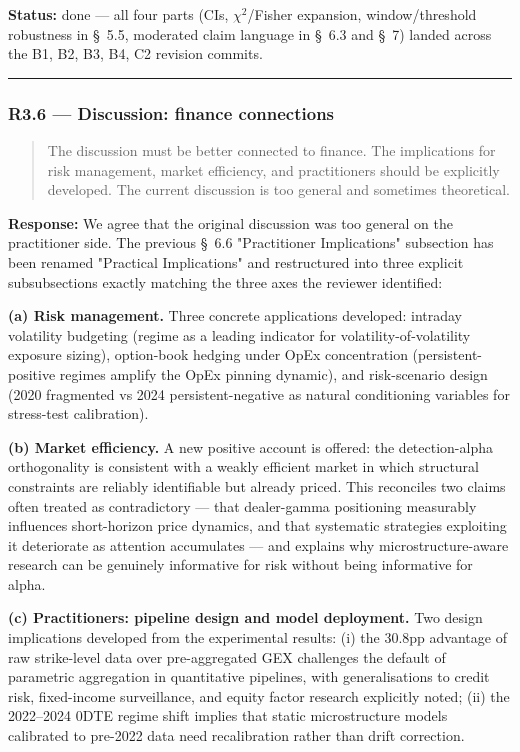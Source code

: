 \documentclass[11pt,a4paper]{article}
\begin{document}
\textbf{Status:} done --- all four parts (CIs, $\chi$$^{2}$/Fisher expansion,
window/threshold robustness in \S{}~5.5, moderated claim language in \S{}~6.3
and \S{}~7) landed across the B1, B2, B3, B4, C2 revision commits.

\bigskip\hrule\bigskip

\subsubsection*{R3.6 --- Discussion: finance connections}

\begin{quote}
The discussion must be better connected to finance. The implications for risk management, market efficiency, and practitioners should be explicitly developed. The current discussion is too general and sometimes theoretical.
\end{quote}

\textbf{Response:} We agree that the original discussion was too general on
the practitioner side. The previous \S{}~6.6 "Practitioner Implications"
subsection has been renamed "Practical Implications" and restructured
into three explicit subsubsections exactly matching the three axes the
reviewer identified:

\textbf{(a) Risk management.} Three concrete applications developed:
intraday volatility budgeting (regime as a leading indicator for
volatility-of-volatility exposure sizing), option-book hedging under
OpEx concentration (persistent-positive regimes amplify the OpEx
pinning dynamic), and risk-scenario design (2020 fragmented vs 2024
persistent-negative as natural conditioning variables for stress-test
calibration).

\textbf{(b) Market efficiency.} A new positive account is offered: the
detection-alpha orthogonality is consistent with a weakly efficient
market in which structural constraints are reliably identifiable but
already priced. This reconciles two claims often treated as
contradictory --- that dealer-gamma positioning measurably influences
short-horizon price dynamics, and that systematic strategies exploiting
it deteriorate as attention accumulates --- and explains why
microstructure-aware research can be genuinely informative for risk
without being informative for alpha.

\textbf{(c) Practitioners: pipeline design and model deployment.} Two
design implications developed from the experimental results: (i) the
30.8pp advantage of raw strike-level data over pre-aggregated GEX
challenges the default of parametric aggregation in quantitative
pipelines, with generalisations to credit risk, fixed-income
surveillance, and equity factor research explicitly noted; (ii) the
2022--2024 0DTE regime shift implies that static microstructure models
calibrated to pre-2022 data need recalibration rather than drift
correction.
\end{document}
